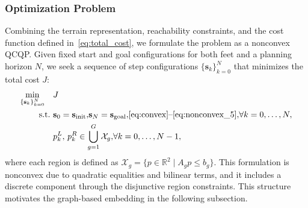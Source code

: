 \documentclass[letterpaper, 10 pt, journal, twoside]{IEEEtran}
\begin{document}
\subsubsection{Optimization Problem}
Combining the terrain representation, reachability constraints, and the cost function defined in~\eqref{eq:total_cost}, we formulate the problem as a nonconvex QCQP.
Given fixed start and goal configurations for both feet and a planning horizon \(N\), we seek a sequence of step configurations $\{\mathbf{s}_k\}_{k=0}^{N}$ that minimizes the total cost $J$:
\begin{equation}
\label{eq:footstep_qcqp}
\begin{aligned}
\min_{\{\mathbf{s}_k\}_{k=0}^{N}} \quad
& J \\
\text{s.t.}\
& \mathbf{s}_0 = \mathbf{s}_{\text{init}},\!
  \mathbf{s}_N = \mathbf{s}_{\text{goal}},\!
  \eqref{eq:convex}\text{--}\eqref{eq:nonconvex_5},\!
  \forall k = 0,\dots,N, \\
& p_k^L,\, p_k^R \in \bigcup_{g=1}^{G} \mathcal{X}_g,\!
  \forall k = 0,\dots,N-1,
\end{aligned}
\end{equation}
\noindent where each region is defined as \(\mathcal{X}_g = \{ p \in \mathbb{R}^2 \mid A_g p \le b_g \}\).
\indent This formulation is nonconvex due to quadratic equalities and bilinear terms, and it includes a discrete component through the disjunctive region constraints.
This structure motivates the graph-based embedding in the following subsection.
\end{document}
